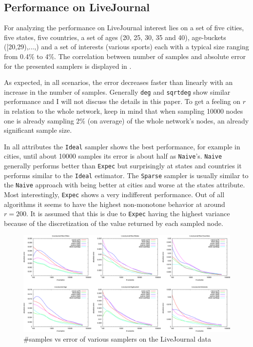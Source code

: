 \subsection{Performance on LiveJournal}
For analyzing the performance on LiveJournal interest lies on a set of five cities, five states, five countries, a set of ages (20, 25, 30, 35 and 40), age-buckets ([20,29),...,) and a set of interests (various sports) each with a typical size ranging from 0.4\% to 4\%.
The correlation between number of samples and absolute error for the presented samplers is displayed in .

As expected, in all scenarios, the error decreases faster than linearly with an increase in the number of samples.
Generally \texttt{deg} and \texttt{sqrtdeg} show similar performance and I will not discuss the details in this paper.
To get a feeling on $r$ in relation to the whole network, keep in mind that when sampling 10000 nodes one is already sampling 2\% (on average) of the whole network's nodes, an already significant sample size.

In all attributes the \texttt{Ideal} sampler shows the best performance, for example in cities, until about 10000 samples its error is about half as \texttt{Naive}'s.
\texttt{Naive} generally performs better than \texttt{Expec} but surprisingly at states and countries it performs similar to the \texttt{Ideal} estimator.
The \texttt{Sparse} sampler is usually similar to the \texttt{Naive} approach with being better at cities and worse at the states attribute.
Most interestingly, \texttt{Expec} shows a very indifferent performance. Out of all algorithms it seems to have the highest non-monotone behavior at around $r=200$. It is assumed that this is due to \texttt{Expec} having the highest variance because of the discretization of the value returned by each sampled node.
\begin{figure}[!ht]
  \begin{center}
    \includegraphics[width=\linewidth]{fig2_3}
    \caption{\#samples vs error of various samplers on the LiveJournal data \cite{dasgupta2012social}}
  \end{center}
\end{figure}

